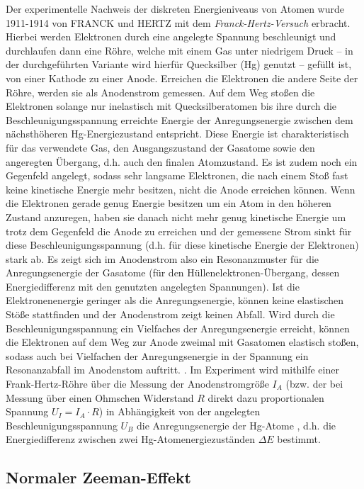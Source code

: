 Der experimentelle Nachweis der diskreten Energieniveaus von Atomen wurde 1911-1914 von \uppercase{Franck} und \uppercase{Hertz} mit dem \textit{Franck-Hertz-Versuch} erbracht. Hierbei werden Elektronen durch eine angelegte Spannung beschleunigt und durchlaufen dann eine Röhre, welche mit einem Gas unter niedrigem Druck -- in der durchgeführten Variante wird hierfür Quecksilber (Hg) genutzt -- gefüllt ist, von einer Kathode zu einer Anode. Erreichen die Elektronen die andere Seite der Röhre, werden sie als Anodenstrom gemessen. Auf dem Weg stoßen die Elektronen solange nur inelastisch mit Quecksilberatomen bis ihre durch die Beschleunigungsspannung erreichte Energie der Anregungsenergie zwischen dem nächsthöheren Hg-Energiezustand entspricht. Diese Energie ist charakteristisch für das verwendete Gas, den Ausgangszustand der Gasatome sowie den angeregten Übergang, d.h. auch den finalen Atomzustand. Es ist zudem noch ein Gegenfeld angelegt, sodass sehr langsame Elektronen, die nach einem Stoß fast keine kinetische Energie mehr besitzen, nicht die Anode erreichen können.
Wenn die Elektronen gerade genug Energie besitzen um ein Atom in den höheren Zustand anzuregen, haben sie danach nicht mehr genug kinetische Energie um trotz dem Gegenfeld die Anode zu erreichen und der gemessene Strom sinkt für diese Beschleunigungsspannung (d.h. für diese kinetische Energie der Elektronen) stark ab. Es zeigt sich im Anodenstrom also ein Resonanzmuster für die Anregungsenergie der Gasatome (für den Hüllenelektronen-Übergang, dessen Energiedifferenz mit den genutzten angelegten Spannungen). Ist die Elektronenenergie geringer als die Anregungsenergie, können keine elastischen Stöße stattfinden und der Anodenstrom zeigt keinen Abfall. Wird durch die Beschleunigungsspannung ein Vielfaches der Anregungsenergie erreicht, können die Elektronen auf dem Weg zur Anode zweimal mit Gasatomen elastisch stoßen, sodass auch bei Vielfachen der Anregungsenergie in der Spannung ein Resonanzabfall im Anodenstom auftritt. \cite[687-688]{gerthsen}. Im Experiment wird mithilfe einer Frank-Hertz-Röhre über die Messung der Anodenstromgröße $I_A$ (bzw. der bei Messung über einen Ohmschen Widerstand $R$ direkt dazu proportionalen Spannung $U_I=I_A\cdot R$) in Abhängigkeit von der angelegten Beschleunigungsspannung $U_B$ die Anregungsenergie der Hg-Atome , d.h. die Energiedifferenz zwischen zwei Hg-Atomenergiezuständen $\Delta E$ bestimmt.

\subsection{Normaler Zeeman-Effekt}
\label{sec:zeeman_intro}

